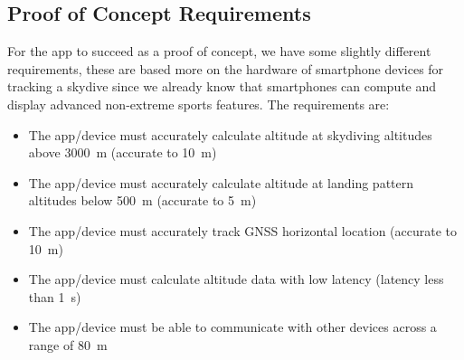 \subsection{Proof of Concept Requirements}\label{subsec:proof-requirements}
For the app to succeed as a proof of concept, we have some slightly different requirements, these are based more on the hardware of smartphone devices for tracking a skydive since we already know that smartphones can compute and display advanced non-extreme sports features.
The requirements are:
\begin{itemize}
  \item The app/device must accurately calculate altitude at skydiving altitudes above \SI{3000}{\metre} (accurate to \SI{10}{\metre})
  \item The app/device must accurately calculate altitude at landing pattern altitudes below \SI{500}{\metre} (accurate to \SI{5}{\metre})
  \item The app/device must accurately track GNSS horizontal location (accurate to \SI{10}{\metre})
  \item The app/device must calculate altitude data with low latency (latency less than \SI{1}{\second})
  \item The app/device must be able to communicate with other devices across a range of \SI{80}{\metre}
\end{itemize}
